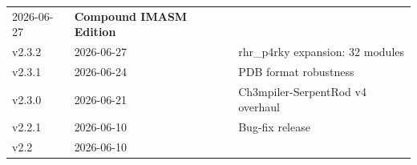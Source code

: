 \begin{longtable}[]{@{}lll@{}}
\begin{minipage}[t]{0.23\columnwidth}
2026-06-27\strut
\end{minipage} & \begin{minipage}[t]{0.34\columnwidth}\raggedright
\textbf{Compound IMASM Edition}\strut
\end{minipage}\tabularnewline
\begin{minipage}[t]{0.34\columnwidth}\raggedright
v2.3.2\strut
\end{minipage} & \begin{minipage}[t]{0.23\columnwidth}\raggedright
2026-06-27\strut
\end{minipage} & \begin{minipage}[t]{0.34\columnwidth}\raggedright
rhr\_p4rky expansion: 32 modules\strut
\end{minipage}\tabularnewline
\begin{minipage}[t]{0.34\columnwidth}\raggedright
v2.3.1\strut
\end{minipage} & \begin{minipage}[t]{0.23\columnwidth}\raggedright
2026-06-24\strut
\end{minipage} & \begin{minipage}[t]{0.34\columnwidth}\raggedright
PDB format robustness\strut
\end{minipage}\tabularnewline
\begin{minipage}[t]{0.34\columnwidth}\raggedright
v2.3.0\strut
\end{minipage} & \begin{minipage}[t]{0.23\columnwidth}\raggedright
2026-06-21\strut
\end{minipage} & \begin{minipage}[t]{0.34\columnwidth}\raggedright
Ch3mpiler-SerpentRod v4 overhaul\strut
\end{minipage}\tabularnewline
\begin{minipage}[t]{0.34\columnwidth}\raggedright
v2.2.1\strut
\end{minipage} & \begin{minipage}[t]{0.23\columnwidth}\raggedright
2026-06-10\strut
\end{minipage} & \begin{minipage}[t]{0.34\columnwidth}\raggedright
Bug-fix release\strut
\end{minipage}\tabularnewline
\begin{minipage}[t]{0.34\columnwidth}\raggedright
v2.2\strut
\end{minipage} & \begin{minipage}[t]{0.23\columnwidth}\raggedright
2026-06-10\strut

\end{minipage}
\end{longtable}
